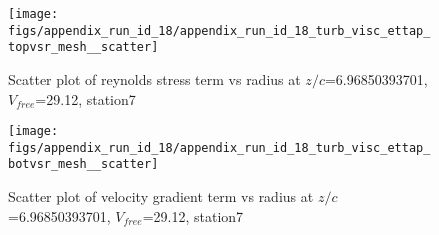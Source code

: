 \begin{figure}[H]
\centering
\texttt{[image: figs/appendix\_run\_id\_18/appendix\_run\_id\_18\_turb\_visc\_ettap\_topvsr\_mesh\_\_scatter]}
\caption{Scatter plot of reynolds stress term vs radius at $z/c$=6.96850393701, $V_{free}$=29.12, station7}
\label{fig:appendix_run_id_18_turb_visc_ettap_topvsr_mesh__scatter}
\end{figure}


\begin{figure}[H]
\centering
\texttt{[image: figs/appendix\_run\_id\_18/appendix\_run\_id\_18\_turb\_visc\_ettap\_botvsr\_mesh\_\_scatter]}
\caption{Scatter plot of velocity gradient term vs radius at $z/c$=6.96850393701, $V_{free}$=29.12, station7}
\label{fig:appendix_run_id_18_turb_visc_ettap_botvsr_mesh__scatter}
\end{figure}


